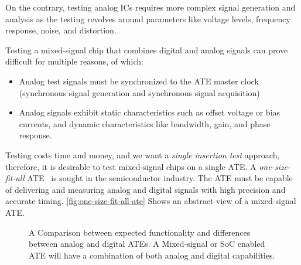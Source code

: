 On the contrary, testing analog \acp{IC} requires more complex
signal generation and analysis as the testing revolves around parameters
like voltage levels, frequency response, noise, and distortion.

Testing a mixed-signal chip that combines digital
and analog signals can prove difficult for multiple reasons, of which:

\begin{itemize}[topsep=8pt,itemsep=4pt,partopsep=4pt, parsep=4pt]
    \item Analog test signals must be synchronized to the ATE master clock
    (synchronous signal generation and synchronous signal acquisition)
    \item Analog signals exhibit static characteristics such as offset voltage
    or bias currents, and dynamic characteristics like bandwidth, gain, and
    phase response.
\end{itemize}

Testing costs time and money, and we want a \emph{single insertion test}
approach, therefore, it is desirable to test mixed-signal chips on a single
\ac{ATE}.
A \emph{one-size-fit-all} \ac{ATE}~\autocite{Burns} is sought
in the semiconductor industry.
The \ac{ATE} must be capable of delivering
and measuring analog and digital signals with high precision and
accurate timing.
\autoref{fig:one-size-fit-all-ate} Shows an abstract view of a mixed-signal
\ac{ATE}.

\begin{figure}[!h]
    \centering
    \caption[Analog v.s. Digital ATE]{A Comparison between
    expected functionality and differences between analog and digital
    \ac{ATE}s. A Mixed-signal or \ac{SoC} enabled \ac{ATE} will have a
    combination of both analog and digital capabilities.}
    \label{fig:one-size-fit-all-ate}
\end{figure}

